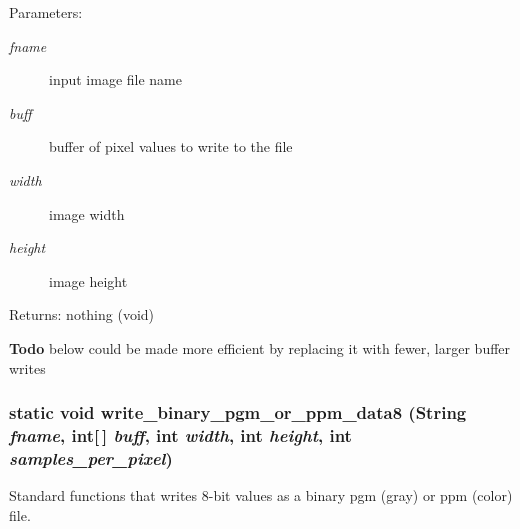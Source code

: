\begin{Desc}
\item[Parameters:]
\begin{description}
\item[{\em fname}]input image file name \item[{\em buff}]buffer of pixel values to write to the file \item[{\em width}]image width \item[{\em height}]image height\end{description}
\end{Desc}
\begin{Desc}
\item[Returns:]nothing (void)\end{Desc}
\begin{Desc}
\item[{\bf Todo}]below could be made more efficient by replacing it with fewer, larger buffer writes \end{Desc}
\subsubsection{\setlength{\rightskip}{0pt plus 5cm}static void write\_\-binary\_\-pgm\_\-or\_\-ppm\_\-data8 (String {\em fname}, int[$\,$] {\em buff}, int {\em width}, int {\em height}, int {\em samples\_\-per\_\-pixel})\hspace{0.3cm}{\tt  [static]}}\label{class_c_s_image_viewer_1_1pnm_helper_60a4449366845ae713e39edda7adfed1}


Standard functions that writes 8-bit values as a binary pgm (gray) or ppm (color) file. 

